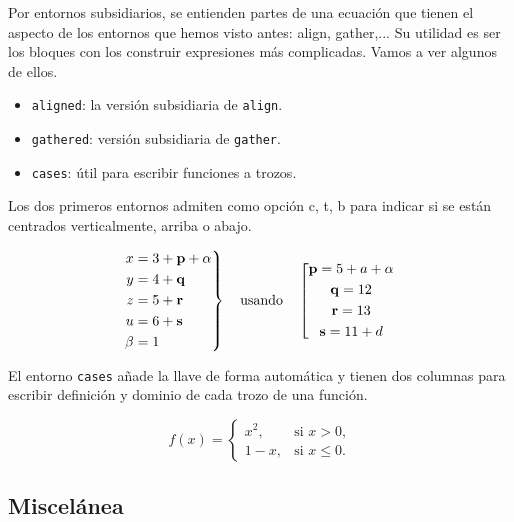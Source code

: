 \documentclass{article}
\numberwithin{equation}{section}
\theoremstyle{plain}
\theoremstyle{definition}
\theoremstyle{remark}
\begin{document}
Por entornos subsidiarios, se entienden partes de una ecuación que tienen el aspecto de los entornos que hemos visto antes: align, gather,... Su utilidad es ser los bloques con los construir expresiones más complicadas. Vamos a ver algunos de ellos.
\begin{itemize}
	\item \texttt{aligned}: la versión subsidiaria de \texttt{align}.
	\item \texttt{gathered}: versión subsidiaria de \texttt{gather}.
	\item \texttt{cases}: útil para escribir funciones a trozos.
\end{itemize}
Los dos primeros entornos admiten como opción c, t, b para indicar si se están centrados verticalmente, arriba o abajo.
\begin{codigo-arriba}
\[
\left.
\begin{aligned}[c]
 x & = 3 + \mathbf{p} + \alpha\\
      y & = 4 + \mathbf{q}\\
      z & = 5 + \mathbf{r}\\
      u & = 6 + \mathbf{s} \\
      \beta & = 1
\end{aligned} \right\}
\text{\quad usando\quad}
\left[
\begin{gathered}
      \mathbf{p} = 5 + a + \alpha\\
      \mathbf{q} = 12\\
      \mathbf{r} = 13\\
      \mathbf{s} = 11 + d
\end{gathered}
\right.
\]
\end{codigo-arriba}
El entorno \texttt{cases} añade la llave de forma automática y tienen dos columnas para escribir definición y dominio de cada trozo de una función.
\begin{codigo-lado}
\[	
f(x) = \begin{cases}
			x^2, & \text{si $x>0$,} \\
			1-x, & \text{si $x \leq 0$.}
	   \end{cases}
\]			
\end{codigo-lado}

\subsection{Miscelánea} \label{sec:misc-ecuaciones}
\end{document}
